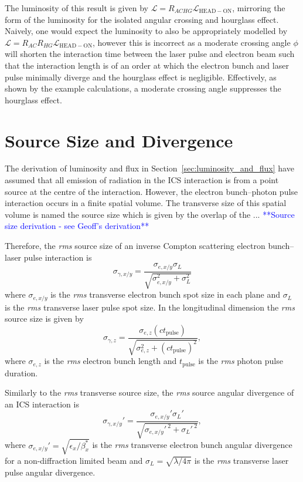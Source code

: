 \documentclass[../main.tex]{subfiles}
\begin{document}
The luminosity of this result is given by $\mathcal{L} = R_{ACHG}\mathcal{L}_{\mathrm{HEAD-ON}}$, mirroring the form of the luminosity for the isolated angular crossing and hourglass effect. Naively, one would expect the luminosity to also be appropriately modelled by $\mathcal{L} = R_{AC}R_{HG}\mathcal{L}_{\mathrm{HEAD-ON}}$, however this is incorrect as a moderate crossing angle $\phi$ will shorten the interaction time between the laser pulse and electron beam such that the interaction length is of an order at which the electron bunch and laser pulse minimally diverge and the hourglass effect is negligible. Effectively, as shown by the example calculations, a moderate crossing angle suppresses the hourglass effect.   

\section{Source Size and Divergence}
\label{sec:source_size_divergence}

The derivation of luminosity and flux in Section~\ref{sec:luminosity_and_flux} have assumed that all emission of radiation in the ICS interaction is from a point source at the centre of the interaction. However, the electron bunch--photon pulse interaction occurs in a finite spatial volume. The transverse size of this spatial volume is named the source size which is given by the overlap of the ...
\textcolor{blue}{**Source size derivation - see Geoff's derivation**}

Therefore, the \textit{rms} source size of an inverse Compton scattering electron bunch--laser pulse interaction is 
\begin{equation}
\sigma_{\gamma,x/y} = \frac{\sigma_{e,x/y}\sigma_{L}}{\sqrt{\sigma_{e,x/y}^{2}+\sigma_{L}^{2}}}
\label{eq:source_size}
\end{equation}
where $\sigma_{e,x/y}$ is the \textit{rms} transverse electron bunch spot size in each plane and $\sigma_{L}$ is the \textit{rms} transverse laser pulse spot size. In the longitudinal dimension the \textit{rms} source size is given by
\begin{equation}
\sigma_{\gamma,z} = \frac{\sigma_{e,z}\left(ct_{\mathrm{pulse}}\right)}{\sqrt{\sigma_{e,z}^{2}+\left(ct_{\mathrm{pulse}}\right)^{2}}},
\label{eq:longitudinal_source_size}
\end{equation}
where $\sigma_{e,z}$ is the \textit{rms} electron bunch length and $t_{\mathrm{pulse}}$ is the \textit{rms} photon pulse duration. 

Similarly to the \textit{rms} transverse source size, the \textit{rms} source angular divergence of an ICS interaction is
\begin{equation}
\sigma_{\gamma,x/y}' = \frac{\sigma_{e,x/y}'\sigma_{L}'}{\sqrt{\sigma_{e,x/y}'^{~2}+\sigma_{L}'^{~2}}},
\label{eq:source_divergence}
\end{equation}
where $\sigma_{e,x/y}' = \sqrt{\epsilon_{x}/\beta_{x}^{*}}$ is the \textit{rms} transverse electron bunch angular divergence for a non-diffraction limited beam and $\sigma_{L} = \sqrt{\lambda/4\pi}$ is the \textit{rms} transverse laser pulse angular divergence.
\end{document}
